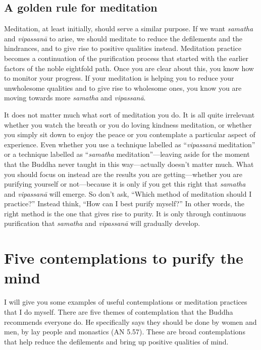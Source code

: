 \documentclass[12pt,openany]{book}
\begin{document}
\section*{A golden rule for meditation}

Meditation, at least initially, should serve a similar purpose. If we want \textit{samatha} and \textit{vipassanā} to arise, we should meditate to reduce the defilements and the hindrances, and to give rise to positive qualities instead. Meditation practice becomes a continuation of the purification process that started with the earlier factors of the noble eightfold path. Once you are clear about this, you know how to monitor your progress. If your meditation is helping you to reduce your unwholesome qualities and to give rise to wholesome ones, you know you are moving towards more \textit{samatha} and \textit{vipassanā}.

It does not matter much what sort of meditation you do. It is all quite irrelevant whether you watch the breath or you do loving kindness meditation, or whether you simply sit down to enjoy the peace or you contemplate a particular aspect of experience. Even whether you use a technique labelled as “\textit{vipassanā} meditation” or a technique labelled as “\textit{samatha} meditation”—leaving aside for the moment that the Buddha never taught in this way—actually doesn’t matter much. What you should focus on instead are the results you are getting—whether you are purifying yourself or not—because it is only if you get this right that \textit{samatha} and \textit{vipassanā} will emerge. So don’t ask, “Which method of meditation should I practice?” Instead think, “How can I best purify myself?” In other words, the right method is the one that gives rise to purity. It is only through continuous purification that \textit{samatha} and \textit{vipassanā} will gradually develop.


\chapter*{Five contemplations to purify the mind}


I will give you some examples of useful contemplations or meditation practices that I do myself. There are five themes of contemplation that the Buddha recommends everyone do. He specifically says they should be done by women and men, by lay people and monastics (AN 5.57). These are broad contemplations that help reduce the defilements and bring up positive qualities of mind.
\end{document}
